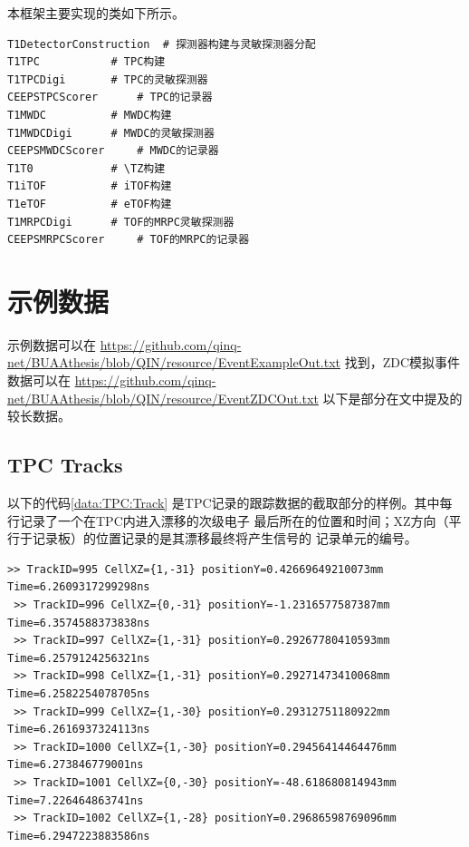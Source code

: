 \documentclass[bachelor,openany,oneside,color]{buaathesis}
\def\TZ{T\textsubscript{0}}
\begin{document}
本框架主要实现的类如下所示。

\begin{lstlisting}[caption={主要实现的类}]
T1DetectorConstruction	# 探测器构建与灵敏探测器分配
T1TPC			# TPC构建
T1TPCDigi		# TPC的灵敏探测器
CEEPSTPCScorer		# TPC的记录器
T1MWDC 			# MWDC构建
T1MWDCDigi		# MWDC的灵敏探测器
CEEPSMWDCScorer		# MWDC的记录器
T1T0			# \TZ构建
T1iTOF 			# iTOF构建
T1eTOF 			# eTOF构建
T1MRPCDigi 		# TOF的MRPC灵敏探测器
CEEPSMRPCScorer		# TOF的MRPC的记录器
\end{lstlisting}

\chapter{示例数据}\label{chap:data}

示例数据可以在
{\do{\/}\do{-}
\url{https://github.com/qinq-net/BUAAthesis/blob/QIN/resource/EventExampleOut.txt}
}
找到，ZDC模拟事件数据可以在
{\do{\/}\do{-}
\url{https://github.com/qinq-net/BUAAthesis/blob/QIN/resource/EventZDCOut.txt}
}
以下是部分在文中提及的较长数据。

\section{TPC Tracks}\label{sec:data:TPC:Track}

以下的代码\ref{data:TPC:Track}
是TPC记录的跟踪数据的截取部分的样例。其中每行记录了一个在TPC内进入漂移的次级电子
最后所在的位置和时间；XZ方向（平行于记录板）的位置记录的是其漂移最终将产生信号的
记录单元的编号。
\begin{lstlisting}[caption={TPC Tracks},label={data:TPC:Track},firstnumber=2650,lastline=2657]
 >> TrackID=995 CellXZ={1,-31} positionY=0.42669649210073mm Time=6.2609317299298ns
 >> TrackID=996 CellXZ={0,-31} positionY=-1.2316577587387mm Time=6.3574588373838ns
 >> TrackID=997 CellXZ={1,-31} positionY=0.29267780410593mm Time=6.2579124256321ns
 >> TrackID=998 CellXZ={1,-31} positionY=0.29271473410068mm Time=6.2582254078705ns
 >> TrackID=999 CellXZ={1,-30} positionY=0.29312751180922mm Time=6.2616937324113ns
 >> TrackID=1000 CellXZ={1,-30} positionY=0.29456414464476mm Time=6.273846779001ns
 >> TrackID=1001 CellXZ={0,-30} positionY=-48.618680814943mm Time=7.226464863741ns
 >> TrackID=1002 CellXZ={1,-28} positionY=0.29686598769096mm Time=6.2947223883586ns
\end{lstlisting}
\end{document}
